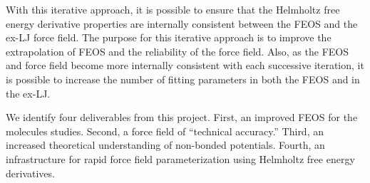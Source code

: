 \documentclass[11pt,a4paper]{article}
\begin{document}
With this iterative approach, it is possible to ensure that the Helmholtz free energy derivative properties are internally consistent between the FEOS and the ex-LJ force field. The purpose for this iterative approach is to improve the extrapolation of FEOS and the reliability of the force field. Also, as the FEOS and force field become more internally consistent with each successive iteration, it is possible to increase the number of fitting parameters in both the FEOS and in the ex-LJ. 

We identify four deliverables from this project. First, an improved FEOS for the molecules studies. Second, a force field of ``technical accuracy.'' Third, an increased theoretical understanding of non-bonded potentials. Fourth, an infrastructure for rapid force field parameterization using Helmholtz free energy derivatives. 
\end{document}
